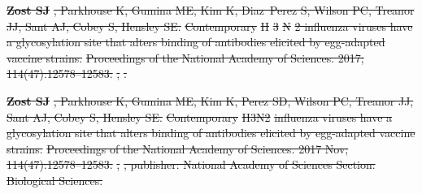 \documentclass[9pt,lineno]{elife} %
\providecommand{\DIFdel}[1]{{\protect\color{red}\sout{#1}}}                      %
\providecommand{\DIFdeltex}[1]{{\protect\color{red}\sout{#1}}}                      %
\providecommand{\DIFdel}[1]{\texorpdfstring{\DIFdeltex{#1}}{}} %
\begin{document}
\textbf{%
\DIFdel{Zost SJ}}%
\DIFdel{, Parkhouse K, Gumina ME, Kim K,
  Diaz~Perez S, Wilson PC, Treanor JJ, Sant AJ, Cobey S, Hensley SE.
}%
\DIFdel{Contemporary }%
\DIFdel{H}%
\DIFdel{3}%
\DIFdel{N}%
\DIFdel{2 influenza viruses have a glycosylation site
  that alters binding of antibodies elicited by egg-adapted vaccine strains.
}%
\DIFdel{Proceedings of the National Academy of Sciences.  2017;
  114(47):12578--12583.
}%
\DIFdel{,
  }%
\DIFdel{.
}%

\textbf{%
\DIFdel{Zost SJ}}%
\DIFdel{, Parkhouse K, Gumina ME, Kim K, Perez
  SD, Wilson PC, Treanor JJ, Sant AJ, Cobey S, Hensley SE.
}%
\DIFdel{Contemporary }%
\DIFdel{H3N2}%
\DIFdel{influenza viruses have a glycosylation site that
  alters binding of antibodies elicited by egg-adapted vaccine strains.
}%
\DIFdel{Proceedings of the National Academy of Sciences.  2017 Nov;
  114(47):12578--12583.
}%
\DIFdel{,
  }%
\DIFdel{, publisher: National Academy of
  Sciences Section: Biological Sciences.
}%


\end{document}
